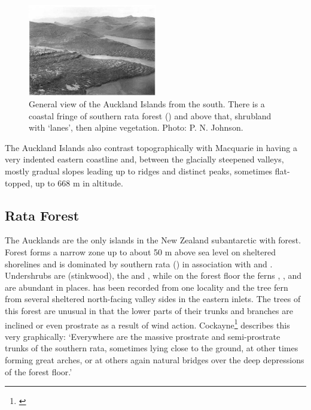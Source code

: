 \begin{figure}
	\includegraphics[width=0.5\textwidth]{graphics/figure116auckland-islands.jpg}
	\centering
	\caption[General view of the Auckland Islands from the south]{General view of the Auckland Islands from the south.
	There is a coastal fringe of southern rata forest () and above that, shrubland with `lanes', then alpine vegetation.
	Photo: P. N. Johnson.}%
	\label{fig:116auckland-islands}
\end{figure}

The Auckland Islands also contrast topographically with Macquarie in having a very indented eastern coastline and, between the glacially steepened valleys, mostly gradual slopes leading up to ridges and distinct peaks, sometimes flat-topped, up to 668 m in altitude.

\subsection{Rata Forest}

The Aucklands are the only islands in the New Zealand subantarctic with forest.
Forest forms a narrow zone up to about 50 m above sea level on sheltered shorelines and is dominated by southern rata () in association with  and .
Undershrubs are  (stinkwood), the  and , while on the forest floor the ferns , , and  are abundant in places.  has been recorded from one locality and the tree fern  from several sheltered north-facing valley sides in the eastern inlets.
The trees of this forest are unusual in that the lower parts of their trunks and branches are inclined or even prostrate as a result of wind action.
Cockayne\footnote{\cite{cockayne1909ecological}} describes this very graphically: `Everywhere are the massive prostrate and semi-prostrate trunks of the southern rata, sometimes lying close to the ground, at other times forming great arches, or at others again natural bridges over the deep depressions of the forest floor.'

